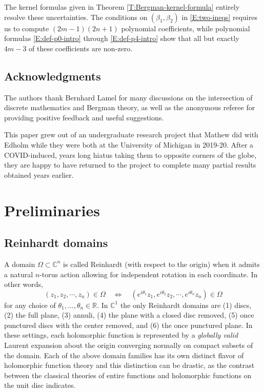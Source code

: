 \documentclass[letterpaper,11pt,reqno]{amsart}
\theoremstyle{plain}
\theoremstyle{definition}
\theoremstyle{remark}
\theoremstyle{remark}
\numberwithin{equation}{section}
\newcommand{\C}{{\mathbb C}}
\newcommand{\R}{{\mathbb R}}
\begin{document}
The kernel formulas given in Theorem \ref{T:Bergman-kernel-formula} entirely resolve these uncertainties.
The conditions on $(\beta_1,\beta_2)$ in \eqref{E:two-ineqs} requires us to compute $(2m-1)(2n+1)$ polynomial coefficients, while polynomial formulas \eqref{E:def-p0-intro} through \eqref{E:def-p4-intro} show that all but exactly $4m-3$ of these coefficients are non-zero.

\subsection{Acknowledgments}
The authors thank Bernhard Lamel for many discussions on the intersection of discrete mathematics and Bergman theory, as well as the anonymous referee for providing positive feedback and useful suggestions.

This paper grew out of an undergraduate research project that Mathew did with Edholm while they were both at the University of Michigan in 2019-20.
After a COVID-induced, years long hiatus taking them to opposite corners of the globe, they are happy to have returned to the project to complete many partial results obtained years earlier.



\section{Preliminaries}\label{S:Bergman-kernel-Reinhardt-domains}

\subsection{Reinhardt domains}
A domain $\Omega \subset \C^n$ is called Reinhardt (with respect to the origin) when it admits a natural $n$-torus action allowing for independent rotation in each coordinate. 
In other words,
\begin{equation*}
(z_1,z_2,\cdots,z_n) \in \Omega \quad \Longleftrightarrow \quad (e^{i \theta_1} z_1, e^{i \theta_2} z_2,\cdots, e^{i \theta_n} z_n) \in \Omega
\end{equation*}
for any choice of $\theta_1,\dots,\theta_n \in \R$. 
In $\C^1$ the only Reinhardt domains are (1) discs, (2) the full plane, (3) annuli, (4) the plane with a closed disc removed, (5) once punctured discs with the center removed, and (6) the once punctured plane.
In these settings, each holomorphic function is represented by a {\em globally valid} Laurent expansion about the origin converging normally on compact subsets of the domain. 
Each of the above domain families has its own distinct flavor of holomorphic function theory and this distinction can be drastic, as the contrast between the classical theories of entire functions and holomorphic functions on the unit disc indicates.
 
\end{document}

